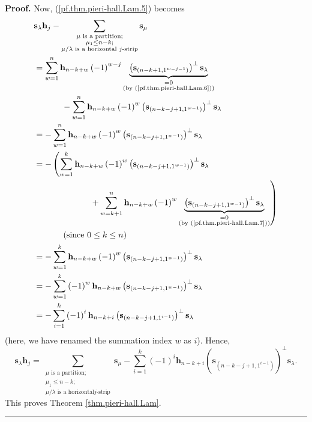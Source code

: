\documentclass[numbers=enddot,12pt,final,onecolumn,notitlepage]{scrartcl}%
\theoremstyle{definition}
\newenvironment{proof}[1][Proof]{\noindent\textbf{#1.} }{\ \rule{0.5em}{0.5em}}
\let\sumnonlimits\sum
\renewcommand{\sum}{\sumnonlimits\limits}
\begin{document}
\begin{proof}
Now, (\ref{pf.thm.pieri-hall.Lam.5}) becomes%
\begin{align*}
&  \mathbf{s}_{\lambda}\mathbf{h}_{j}-\sum_{\substack{\mu\text{ is a
partition;}\\\mu_{1}\leq n-k;\\\mu/\lambda\text{ is a horizontal
}j\text{-strip}}}\mathbf{s}_{\mu}\\
&  =\sum_{w=1}^{n}\mathbf{h}_{n-k+w}\left(  -1\right)  ^{w-j}%
\underbrace{\left(  \mathbf{s}_{\left(  n-k+1,1^{w-j-1}\right)  }\right)
^{\perp}\mathbf{s}_{\lambda}}_{\substack{=0\\\text{(by
(\ref{pf.thm.pieri-hall.Lam.6}))}}}\\
&  \ \ \ \ \ \ \ \ \ \ -\sum_{w=1}^{n}\mathbf{h}_{n-k+w}\left(  -1\right)
^{w}\left(  \mathbf{s}_{\left(  n-k-j+1,1^{w-1}\right)  }\right)  ^{\perp
}\mathbf{s}_{\lambda}\\
&  =-\sum_{w=1}^{n}\mathbf{h}_{n-k+w}\left(  -1\right)  ^{w}\left(
\mathbf{s}_{\left(  n-k-j+1,1^{w-1}\right)  }\right)  ^{\perp}\mathbf{s}%
_{\lambda}\\
&  =-\left(  \sum_{w=1}^{k}\mathbf{h}_{n-k+w}\left(  -1\right)  ^{w}\left(
\mathbf{s}_{\left(  n-k-j+1,1^{w-1}\right)  }\right)  ^{\perp}\mathbf{s}%
_{\lambda}\right. \\
&  \ \ \ \ \ \ \ \ \ \ \ \ \ \ \ \ \ \ \ \ \left.  +\sum_{w=k+1}^{n}%
\mathbf{h}_{n-k+w}\left(  -1\right)  ^{w}\underbrace{\left(  \mathbf{s}%
_{\left(  n-k-j+1,1^{w-1}\right)  }\right)  ^{\perp}\mathbf{s}_{\lambda}%
}_{\substack{=0\\\text{(by (\ref{pf.thm.pieri-hall.Lam.7}))}}}\right) \\
&  \ \ \ \ \ \ \ \ \ \ \left(  \text{since }0\leq k\leq n\right) \\
&  =-\sum_{w=1}^{k}\mathbf{h}_{n-k+w}\left(  -1\right)  ^{w}\left(
\mathbf{s}_{\left(  n-k-j+1,1^{w-1}\right)  }\right)  ^{\perp}\mathbf{s}%
_{\lambda}\\
&  =-\sum_{w=1}^{k}\left(  -1\right)  ^{w}\mathbf{h}_{n-k+w}\left(
\mathbf{s}_{\left(  n-k-j+1,1^{w-1}\right)  }\right)  ^{\perp}\mathbf{s}%
_{\lambda}\\
&  =-\sum_{i=1}^{k}\left(  -1\right)  ^{i}\mathbf{h}_{n-k+i}\left(
\mathbf{s}_{\left(  n-k-j+1,1^{i-1}\right)  }\right)  ^{\perp}\mathbf{s}%
_{\lambda}%
\end{align*}
(here, we have renamed the summation index $w$ as $i$). Hence,%
\[
\mathbf{s}_{\lambda}\mathbf{h}_{j}=\sum_{\substack{\mu\text{ is a
partition;}\\\mu_{1}\leq n-k;\\\mu/\lambda\text{ is a horizontal
}j\text{-strip}}}\mathbf{s}_{\mu}-\sum_{i=1}^{k}\left(  -1\right)
^{i}\mathbf{h}_{n-k+i}\left(  \mathbf{s}_{\left(  n-k-j+1,1^{i-1}\right)
}\right)  ^{\perp}\mathbf{s}_{\lambda}.
\]
This proves Theorem \ref{thm.pieri-hall.Lam}.
\end{proof}
\end{document}
